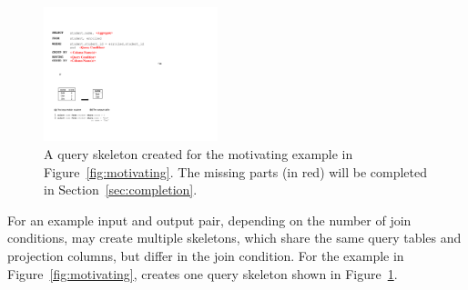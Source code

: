 
\vspace{1mm}



%

\begin{figure}[t]
	\centering
		\includegraphics[width=0.45\textwidth]{sql_skeleton.pdf}
        \vspace{-3mm}
	\caption{A query skeleton created for the motivating example
in Figure~\ref{fig:motivating}. The missing parts (in red) will
be completed in Section~\ref{sec:completion}.}
	\label{fig:skeleton}
\end{figure}


For an example input and output pair,
depending on the number of join conditions,
\ourtool may create multiple skeletons,
which share the same query tables and
projection columns, but differ in the join condition.
For the example in Figure~\ref{fig:motivating},
\ourtool creates one query skeleton shown in Figure~\ref{fig:skeleton}.







